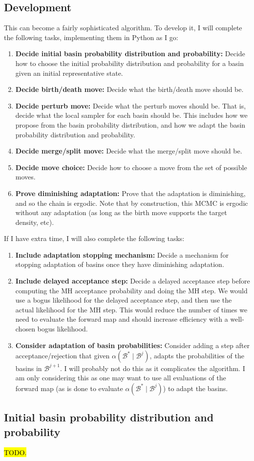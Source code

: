 \documentclass[12pt]{article}
\theoremstyle{definition}
\theoremstyle{remark}
\theoremstyle{plain}
\begin{document}
\subsection{Development}
This can become a fairly sophisticated algorithm. 
To develop it, I will complete the following tasks, implementing them in Python as I go:
\begin{enumerate}
  \item \textbf{Decide initial basin probability distribution and probability:} Decide how to choose the initial probability distribution and probability for a basin given an initial representative state.
  \item \textbf{Decide birth/death move:} Decide what the birth/death move should be.
  \item \textbf{Decide perturb move:} Decide what the perturb moves should be. That is, decide what the local sampler for each basin should be. This includes how we propose from the basin probability distribution, and how we adapt the basin probability distribution and probability.
  \item \textbf{Decide merge/split move:} Decide what the merge/split move should be.
  \item \textbf{Decide move choice:} Decide how to choose a move from the set of possible moves.
  \item \textbf{Prove diminishing adaptation:} Prove that the adaptation is diminishing, and so the chain is ergodic. 
  Note that by construction, this MCMC is ergodic without any adaptation 
  (as long as the birth move supports the target density, etc).
\end{enumerate}

If I have extra time, I will also complete the following tasks:
\begin{enumerate}
  \item \textbf{Include adaptation stopping mechanism:} Decide a mechanism for stopping adaptation of basins once they have diminishing adaptation. 
  \item \textbf{Include delayed acceptance step:} Decide a delayed acceptance step before computing the MH acceptance probability and doing the MH step. 
  We would use a bogus likelihood for the delayed acceptance step, and then use the actual likelihood for the MH step.
  This would reduce the number of times we need to evaluate the forward map and should increase efficiency 
  with a well-chosen bogus likelihood.
  \item \textbf{Consider adaptation of basin probabilities:} Consider adding a step after 
  acceptance/rejection that given $\alpha(\mathcal{B}^{*} \mid \mathcal{B}^j)$, 
  adapts the probabilities of the basins in $\mathcal{B}^{j+1}$. I will probably not do this 
  as it complicates the algorithm. I am only considering this as one may want to use all evaluations 
  of the forward map (as is done to evaluate $\alpha(\mathcal{B}^{*} \mid \mathcal{B}^j)$) to adapt the basins.
\end{enumerate}

\subsection{Initial basin probability distribution and probability}
\hl{TODO.}


% 
% 
\end{document}
